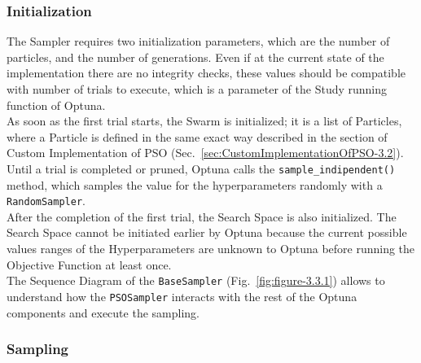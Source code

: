 \subsubsection{Initialization}
The Sampler requires two initialization parameters, which are the number of particles, and the number of generations. 
Even if at the current state of the implementation there are no integrity checks, these values should be compatible with number of trials to execute, which is a parameter of the Study running function of Optuna. 
\\[0.3cm]As soon as the first trial starts, the Swarm is initialized; it is a list of Particles, where a Particle is defined in the same exact way described in the section of Custom Implementation of PSO (Sec.~\ref{sec:CustomImplementationOfPSO-3.2}).
\\[0.3cm]Until a trial is completed or pruned, Optuna calls the \texttt{sample\_indipendent()} method, which samples the value for the hyperparameters randomly with a \texttt{RandomSampler}.
\\[0.3cm]After the completion of the first trial, the Search Space is also initialized. The Search Space cannot be initiated earlier by Optuna because the current possible values ranges of the Hyperparameters are unknown to Optuna before running the Objective Function at least once.
\\[0.3cm]The Sequence Diagram of the \texttt{BaseSampler} (Fig.~\ref{fig:figure-3.3.1}) allows to understand how the \texttt{PSOSampler} interacts with the rest of the Optuna components and execute the sampling.

\subsubsection{Sampling}

